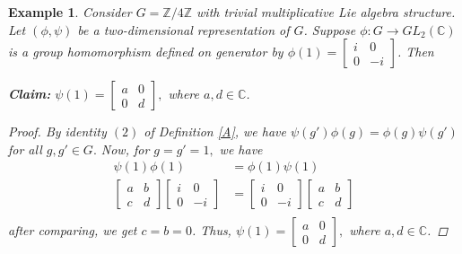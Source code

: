 \documentclass[10 pt,oneside,reqno,a4paper]{amsart}
\newtheorem{example}[theorem]{Example}
\numberwithin{equation}{section}
\newcommand{\field}[1]{\mathbb{#1}}          \newcommand{\Q}{\field{Q}}
\newcommand{\C}{\field{C}}                   \newcommand{\A}{\field{A}}
\begin{document}
\begin{example}\label{1.9}
    Consider $G=\mathbb{Z}/4\mathbb{Z}$ with trivial multiplicative Lie algebra structure. Let $(\phi,\psi)$ be a two-dimensional representation of $G$. Suppose $\phi:G \to GL_2(\C)$ is a group homomorphism defined on generator by $\phi(1)=\begin{bmatrix}
i & 0 \\
0 & -i
\end{bmatrix}$. Then 

\textbf{Claim:} $\psi(1)=\begin{bmatrix}
a & 0 \\
0 & d
\end{bmatrix},$ where $a,d\in \C$.
\begin{proof}
    By  identity $(2)$ of Definition \ref{A}, we have 
    $\psi(g')\phi(g)=\phi(g)\psi(g')$ for all $g,g' \in G.$ Now, for $g=g'=1,$ we have
    \begin{align*}
        \psi(1)\phi(1) &=\phi(1)\psi(1)\\
        \begin{bmatrix}
a & b \\
c & d
\end{bmatrix}\begin{bmatrix}
i & 0 \\
0 & -i
\end{bmatrix} &= \begin{bmatrix}
i & 0 \\
0 & -i
\end{bmatrix} \begin{bmatrix}
a & b \\
c & d
\end{bmatrix}\\
    \end{align*} after comparing, we get $c=b=0$. Thus, $\psi(1)=\begin{bmatrix}
a & 0 \\
0 & d
\end{bmatrix},$ where $a,d\in \C$.
\end{proof}

\end{example}









\end{document}
